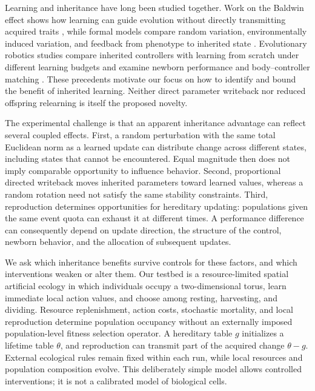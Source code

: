 \documentclass[11pt]{article}
\begin{document}
Learning and inheritance have long been studied together. Work on the Baldwin effect shows how learning can guide evolution without directly transmitting acquired traits \cite{hinton1987}, while formal models compare random variation, environmentally induced variation, and feedback from phenotype to inherited state \cite{rivoire2014}. Evolutionary robotics studies compare inherited controllers with learning from scratch under different learning budgets \cite{jelisavcic2019} and examine newborn performance and body--controller matching \cite{luo2023}. These precedents motivate our focus on how to identify and bound the benefit of inherited learning. Neither direct parameter writeback nor reduced offspring relearning is itself the proposed novelty.

The experimental challenge is that an apparent inheritance advantage can reflect several coupled effects. First, a random perturbation with the same total Euclidean norm as a learned update can distribute change across different states, including states that cannot be encountered. Equal magnitude then does not imply comparable opportunity to influence behavior. Second, proportional directed writeback moves inherited parameters toward learned values, whereas a random rotation need not satisfy the same stability constraints. Third, reproduction determines opportunities for hereditary updating: populations given the same event quota can exhaust it at different times. A performance difference can consequently depend on update direction, the structure of the control, newborn behavior, and the allocation of subsequent updates.

We ask which inheritance benefits survive controls for these factors, and which interventions weaken or alter them. Our testbed is a resource-limited spatial artificial ecology in which individuals occupy a two-dimensional torus, learn immediate local action values, and choose among resting, harvesting, and dividing. Resource replenishment, action costs, stochastic mortality, and local reproduction determine population occupancy without an externally imposed population-level fitness selection operator. A hereditary table $g$ initializes a lifetime table $\theta$, and reproduction can transmit part of the acquired change $\theta-g$. External ecological rules remain fixed within each run, while local resources and population composition evolve. This deliberately simple model allows controlled interventions; it is not a calibrated model of biological cells.
\end{document}

